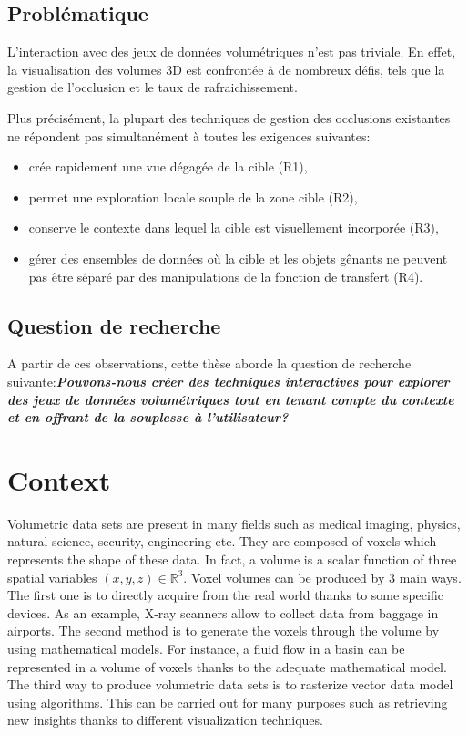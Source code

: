 \subsection{Problématique}
L'interaction avec des jeux de données volumétriques n'est pas triviale. En effet, la visualisation des volumes 3D est confrontée à de nombreux défis, tels que la gestion de l'occlusion et le taux de rafraichissement.


Plus précisément, la plupart des techniques de gestion des occlusions existantes ne répondent pas simultanément à toutes les exigences suivantes:
\begin{itemize}
\item crée rapidement une vue dégagée de la cible (R1),
\item permet une exploration locale souple de la zone cible (R2),
\item conserve le contexte dans lequel la cible est visuellement incorporée (R3),
\item gérer des ensembles de données où la cible et les objets gênants ne peuvent pas être séparé par des manipulations de la fonction de transfert (R4).
\end{itemize}

\subsection{ Question de recherche }

A partir de ces observations, cette thèse aborde la question de recherche suivante:\textbf{\textit{Pouvons-nous créer des techniques interactives pour explorer des jeux de données volumétriques tout en tenant compte du contexte et en offrant de la souplesse à l'utilisateur? }}
\NewPage


\section{Context}

Volumetric data sets are present in many fields such as medical imaging, physics, natural science, security, engineering etc. They are composed of voxels which represents the shape of these data. In fact, a volume is a scalar function of three spatial variables $(x,y,z) \in \mathbb{R}^3$. Voxel volumes can be produced by 3 main ways. The first one is to directly acquire from the real world thanks to some specific devices. As an example, X-ray scanners allow to collect data from baggage in airports. The second method is to generate the voxels through the volume by using mathematical models. For instance, a fluid flow in a basin can be represented in a volume of voxels thanks to the adequate mathematical model. The third way to produce volumetric data sets is to  rasterize vector data model using algorithms. This can be carried out for many purposes such as retrieving new insights thanks to different visualization techniques.


